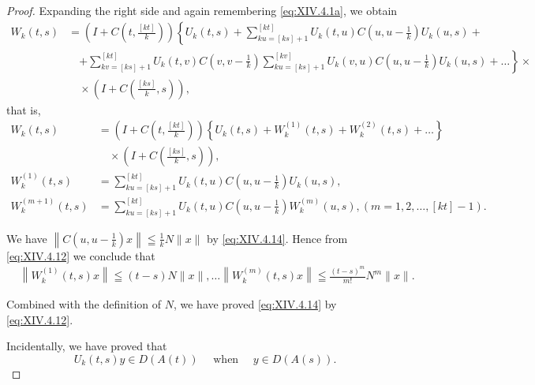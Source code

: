 \begin{proof}
Expanding the right side and again remembering \eqref{eq:XIV.4.1a}, we obtain 
\[
\begin{aligned}
W _{k} (t, s)& = \left(I + C \left(t, \frac {[ k t ]}{k}\right)\right) \left\{U _{k} (t, s) + \sum\limits_{ku=[ks]+1} ^{[kt]} U _{k} (t, u) C \left(u, u - \frac {1}{k}\right) U _{k} (u, s) + \right.
\\
&\quad \left. + \sum\limits_{kv=[ks]+1} ^{[kt]} U _{k} (t, v) C \left(v, v - \frac {1}{k}\right) \sum\limits_{ku=[ks]+1} ^{[kv]} U _{k} (v, u) C \left(u, u - \frac {1}{k}\right) U _{k} (u, s) + \dots \right\} \times
\\
&\quad \times \left(I + C \left(\frac {[ k s ]}{k}, s\right)\right),
\end{aligned}
\]
that is, 
\begin{equation}\label{eq:XIV.4.15}
\begin{aligned} 
    W _{k} (t, s) & = \left(I + C \left(t, \frac {[ k t ]}{k}\right)\right) \left\{U _{k} (t, s) + W _{k} ^{(1)} (t, s) + W _{k} ^{(2)} (t, s) + \dots \right\} \\
&\quad \times \left(I + C \left(\frac {[ k s ]}{k}, s\right)\right), \\ 
    W _{k} ^{(1)} (t, s) & = \sum\limits_{ku=[ks]+1} ^{[kt]} U _{k} (t, u) C \left(u, u - \frac {1}{k}\right) U _{k} (u, s), \\ 
    W _{k} ^{(m+1)} (t, s) & = \sum\limits_{ku=[ks]+1} ^{[kt]} U _{k} (t, u) C \left(u, u - \frac {1}{k}\right) W _{k} ^{(m)} (u, s), (m = 1, 2, \dots , [ k t ] - 1). 
\end{aligned}
\end{equation}

We have $\left\| C\left(u, u - \frac{1}{k}\right)x\right\| \leqq \frac{1}{k} N \| x\|$ by \eqref{eq:XIV.4.14}. Hence from \eqref{eq:XIV.4.12} we conclude that 
\begin{equation}\label{eq:XIV.4.16}
\begin{aligned}
&\left\| W _{k} ^{(1)} (t, s) x \right\| \leqq (t - s) N \| x \|, \dots \left\| W _{k} ^{(m)} (t, s) x \right\| \leqq \frac {(t - s) ^{m}}{m !} N ^{m} \| x \|.
\end{aligned}
\end{equation}

Combined with the definition of $N$, we have proved \eqref{eq:XIV.4.14} by \eqref{eq:XIV.4.12}.

Incidentally, we have proved that 
\begin{equation}\label{eq:XIV.4.17}
U _{k} (t, s) y \in D (A (t)) \quad \text{ when } \quad y \in D (A (s)).
\end{equation}


\end{proof}
